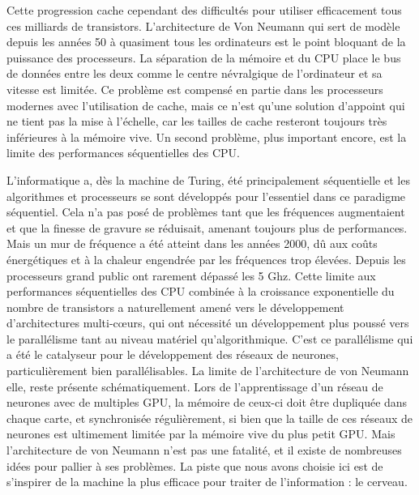 	Cette progression cache cependant des difficultés pour utiliser efficacement tous ces milliards de transistors. L'architecture de Von Neumann \cite{von1993first} qui sert de modèle depuis les années 50 à quasiment tous les ordinateurs est le point bloquant de la puissance des processeurs. La séparation de la mémoire et du CPU place le bus de données entre les deux comme le centre névralgique de l'ordinateur et sa vitesse est limitée. Ce problème est compensé en partie dans les processeurs modernes avec l'utilisation de cache, mais ce n'est qu'une solution d'appoint qui ne tient pas la mise à l'échelle, car les tailles de cache resteront toujours très inférieures à la mémoire vive. Un second problème, plus important encore, est la limite des performances séquentielles des CPU. 
	
	L'informatique a, dès la machine de Turing, été principalement séquentielle et les algorithmes et processeurs se sont développés pour l'essentiel dans ce paradigme séquentiel. Cela n'a pas posé de problèmes tant que les fréquences augmentaient et que la finesse de gravure se réduisait, amenant toujours plus de performances. Mais un mur de fréquence a été atteint dans les années 2000, dû aux coûts énergétiques et à la chaleur engendrée par les fréquences trop élevées. Depuis les processeurs grand public ont rarement dépassé les 5 Ghz. Cette limite aux performances séquentielles des CPU combinée à la croissance exponentielle du nombre de transistors a naturellement amené vers le développement d'architectures multi-cœurs, qui ont nécessité un développement plus poussé vers le parallélisme tant au niveau matériel qu'algorithmique. C'est ce parallélisme qui a été le catalyseur pour le développement des réseaux de neurones, particulièrement bien parallélisables. La limite de l'architecture de von Neumann elle, reste présente schématiquement. Lors de l'apprentissage d'un réseau de neurones avec de multiples GPU, la mémoire de ceux-ci doit être dupliquée dans chaque carte, et synchronisée régulièrement, si bien que la taille de ces réseaux de neurones est ultimement limitée par la mémoire vive du plus petit GPU. Mais l'architecture de von Neumann n'est pas une fatalité, et il existe de nombreuses idées pour pallier à ses problèmes. La piste que nous avons choisie ici est de s'inspirer de la machine la plus efficace pour traiter de l'information : le cerveau.

